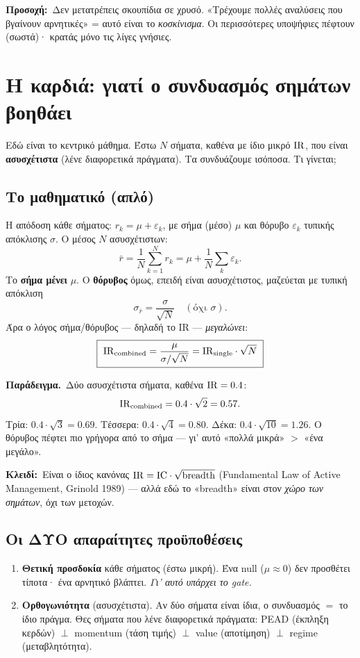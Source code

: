\documentclass[11pt]{article}
\newcommand{\key}[1]{\par\medskip\noindent\colorbox{soft}{\parbox{\dimexpr\linewidth-2\fboxsep}{\textcolor{accent}{\textbf{Κλειδί:}}\ #1}}\par\medskip}
\newcommand{\ex}[1]{\par\smallskip\noindent\textbf{\textcolor{accent}{Παράδειγμα.}}\ #1\par\smallskip}
\newcommand{\warnb}[1]{\par\medskip\noindent\colorbox{soft}{\parbox{\dimexpr\linewidth-2\fboxsep}{\textcolor{warn}{\textbf{Προσοχή:}}\ #1}}\par\medskip}
\begin{document}
\warnb{Δεν μετατρέπεις σκουπίδια σε χρυσό. «Τρέχουμε πολλές αναλύσεις που βγαίνουν αρνητικές» = αυτό
είναι το \emph{κοσκίνισμα}. Οι περισσότερες υποψήφιες πέφτουν (σωστά)· κρατάς μόνο τις λίγες γνήσιες.}

\section{Η καρδιά: γιατί ο συνδυασμός σημάτων βοηθάει}

Εδώ είναι το κεντρικό μάθημα. Έστω $N$ σήματα, καθένα με ίδιο μικρό $\mathrm{IR}$, που είναι
\textbf{ασυσχέτιστα} (λένε διαφορετικά πράγματα). Τα συνδυάζουμε ισόποσα. Τι γίνεται;

\subsection{Το μαθηματικό (απλό)}
Η απόδοση κάθε σήματος: $r_k=\mu+\varepsilon_k$, με σήμα (μέσο) $\mu$ και θόρυβο $\varepsilon_k$ τυπικής
απόκλισης $\sigma$. Ο μέσος $N$ ασυσχέτιστων:
\[
\bar r=\frac{1}{N}\sum_{k=1}^N r_k=\mu+\frac{1}{N}\sum_k \varepsilon_k.
\]
Το \textbf{σήμα μένει} $\mu$. Ο \textbf{θόρυβος} όμως, επειδή είναι ασυσχέτιστος, μαζεύεται με τυπική
απόκλιση
\[
\sigma_{\bar r}=\frac{\sigma}{\sqrt{N}}\quad(\text{όχι }\sigma).
\]
Άρα ο λόγος σήμα/θόρυβος --- δηλαδή το IR --- \emph{μεγαλώνει}:
\[
\boxed{\ \IR_{\text{combined}}=\frac{\mu}{\sigma/\sqrt{N}}=\IR_{\text{single}}\cdot\sqrt{N}\ }
\]

\ex{Δύο ασυσχέτιστα σήματα, καθένα $\mathrm{IR}=0.4$:
\[
\mathrm{IR}_{\text{combined}}=0.4\cdot\sqrt{2}=0.57.
\]
Τρία: $0.4\cdot\sqrt{3}=0.69$. Τέσσερα: $0.4\cdot\sqrt{4}=0.80$. Δέκα: $0.4\cdot\sqrt{10}=1.26$.
Ο θόρυβος πέφτει πιο γρήγορα από το σήμα --- γι' αυτό «πολλά μικρά» $>$ «ένα μεγάλο».}

\key{Είναι ο ίδιος κανόνας $\mathrm{IR}=\mathrm{IC}\cdot\sqrt{\text{breadth}}$ (Fundamental Law of Active Management,
Grinold 1989) --- αλλά εδώ το «breadth» είναι στον \emph{χώρο των σημάτων}, όχι των μετοχών.}

\subsection{Οι ΔΥΟ απαραίτητες προϋποθέσεις}
\begin{enumerate}[leftmargin=1.4em]
\item \textbf{Θετική προσδοκία} κάθε σήματος (έστω μικρή). Ένα null ($\mu\approx 0$) δεν προσθέτει
τίποτα· ένα αρνητικό βλάπτει. \emph{Γι' αυτό υπάρχει το gate.}
\item \textbf{Ορθογωνιότητα} (ασυσχέτιστα). Αν δύο σήματα είναι ίδια, ο συνδυασμός $=$ το ίδιο πράγμα.
Θες σήματα που λένε διαφορετικά πράγματα: PEAD (έκπληξη κερδών) $\perp$ momentum (τάση τιμής) $\perp$
value (αποτίμηση) $\perp$ regime (μεταβλητότητα).
\end{enumerate}
\end{document}
